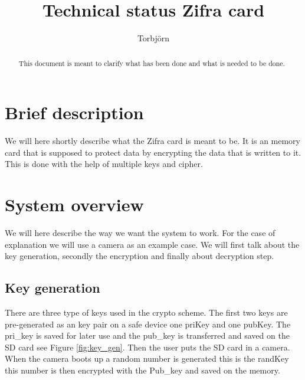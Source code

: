 \documentclass[]{article}
\title{Technical status Zifra card}
\author{Torbjörn}
\begin{document}
\maketitle
\tableofcontents
\newpage
\newpage

\begin{abstract}
This document is meant to clarify what has been done and what is needed to be done.
\end{abstract}

\newpage







\section{Brief description}
We will here shortly describe what the Zifra card is meant to be.
It is an memory card that is supposed to protect data by encrypting the data that is written to it.
This is done with the help of multiple \gls{keys} and \gls{cipher}.

\section{System overview}
We will here describe the way we want the system to work.
For the case of explanation we will use a camera as an example case.
We will first talk about the key generation, secondly the encryption and finally about decryption step.

\subsection{Key generation}
There are three type of keys used in the crypto scheme.
The first two keys are pre-generated as an key pair on a safe device one \acrfull{priKey} and one \acrfull{pubKey}.
The pri\_key is saved for later use and the pub\_key is transferred and saved on the SD card see Figure \ref{fig:key_gen}.
Then the user puts the SD card in a camera.
When the camera boots up a random number is generated this is the \acrfull{randKey} this number is then encrypted with the Pub\_key and saved on the memory.
\end{document}
